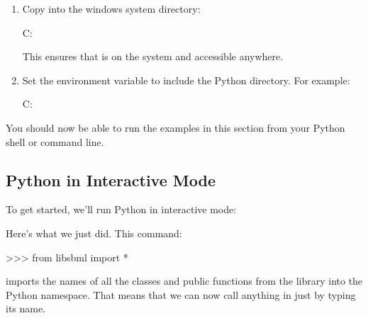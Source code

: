 \documentclass{sbmlmanual}
\begin{document}
\begin{enumerate}

\item
Copy  into the windows system directory:

\begin{shellVerbatim}
C:\WINDOWS{}
\end{shellVerbatim}

This ensures that  is on the system  and
accessible anywhere.

\item
Set the environment variable  to include the \libsbml{}
Python directory.  For example:

\begin{shellVerbatim}
C:\libsbml\bindings\python
\end{shellVerbatim}

\end{enumerate}

You should now be able to run the examples in this section from your Python
shell or command line.


\subsection{Python in Interactive Mode}
\label{sec:python-interactive}

To get started, we'll run Python in interactive mode:


Here's what we just did.  This command:

\begin{shellVerbatim}
>>> from libsbml import *
\end{shellVerbatim}

imports the names of all the classes and public functions
from the \libsbml{} library into the Python namespace.  That
means that we can now call anything in \libsbml{} just by
typing its name.
\end{document}
